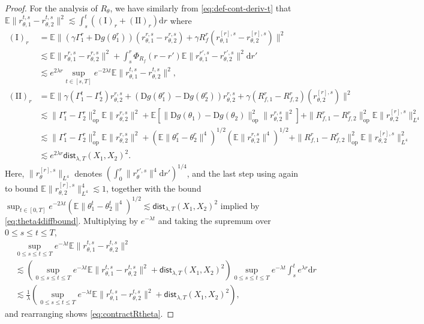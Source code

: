 \documentclass[11pt,letterpaper,reqno]{amsart}
\theoremstyle{definition}
\def\d{\mathrm{d}}
\def\D{\mathrm{D}}
\def\E{\mathbb{E}}
\def\op{\mathrm{op}}
\newcommand{\lbddst}[2]{\mathsf{dist}_{\lambda,T}(#1,#2)}
\newcommand{\normop}[1]{\|#1\|_{\mathrm{op}}}
\begin{document}
\begin{proof}
For the analysis of $R_\theta$, we have similarly
from \eqref{eq:def-cont-deriv-t} that
$\E\|r_{\theta,1}^{t,s}-r_{\theta,2}^{t,s}\|^2
\lesssim \int_s^t ((\mathrm{I})_r+(\mathrm{II})_r)\d r$ where
\begin{align*}
(\mathrm{I})_r&=\E\Big\|(\gamma \Gamma_1^r+\D g(\theta_1^r))
(r_{\theta,1}^{r,s}-r_{\theta,2}^{r,s})
+\gamma R_f^r(r_{\theta,1}^{[r],s}-r_{\theta,2}^{[r],s})\Big\|^2\\
&\lesssim \E\|r_{\theta,1}^{r,s}-r_{\theta,2}^{r,s}\|^2
+\int_s^r \Phi_{R_f}(r-r')\E\|r_{\theta,1}^{r',s}-r_{\theta,2}^{r',s}\|^2\d
r'\\
&\lesssim e^{2\lambda r} \sup_{t \in [s,T]}
e^{-2\lambda t}\E\|r_{\theta,1}^{t,s}-r_{\theta,2}^{t,s}\|^2,\\
(\mathrm{II})_r&=\E\Big\|\gamma(\Gamma^t_1 - \Gamma^t_2)r_{\theta,2}^{r,s}
+(\D g(\theta^r_1)-\D g(\theta^r_2))r_{\theta,2}^{r,s}
+ \gamma (R_{f,1}^r-R_{f,2}^r)(r_{\theta,2}^{[r],s})\Big\|^2\\
&\lesssim \|\Gamma_1^r-\Gamma_2^r\|_\op^2 \E\|r_{\theta,2}^{r,s}\|^2
+\E[\|\D g(\theta_1)-\D g(\theta_2)\|_\op^2\|r_{\theta,2}^{r,s}\|^2]
+\normop{R_{f,1}^r-R_{f,2}^r}^2\E\|r_{\theta,2}^{[r],s}\|_{L^4}^2\\
&\lesssim \|\Gamma_1^r-\Gamma_2^r\|_\op^2 \E\|r_{\theta,2}^{r,s}\|^2
+(\E\|\theta_1^r-\theta_2^r\|^4)^{1/2}(\E\|r_{\theta,2}^{r,s}\|^4)^{1/2}
+\normop{R_{f,1}^r-R_{f,2}^r}^2\E\|r_{\theta,2}^{[r],s}\|_{L^4}^2\\
&\lesssim e^{2\lambda r}\lbddst{X_1}{X_2}^2.
\end{align*}
Here, $\|r_\theta^{[r],s}\|_{L^4}$ denotes
$(\int_0^r \|r_\theta^{r',s}\|^4 \d r')^{1/4}$,
and the last step using again  
to bound $\E\|r_{\theta,2}^{[r],s}\|_{L^4}^4 \lesssim 1$, together with the
bound $\sup_{t \in [0,T]} e^{-2\lambda t}(\E\|\theta_1^t-\theta_2^t\|^4)^{1/2}
\lesssim \lbddst{X_1}{X_2}^2$ implied by \eqref{eq:theta4diffbound}.
Multiplying by $e^{-\lambda t}$ and taking the supremum over $0 \leq s \leq t
\leq T$,
\begin{align*}
&\sup_{0 \leq s \leq t \leq T} e^{-\lambda t}
\E\|r_{\theta,1}^{t,s}-r_{\theta,2}^{t,s}\|^2\\
&\lesssim \left(\sup_{0 \leq s \leq t \leq T} e^{-\lambda t}
\E\|r_{\theta,1}^{t,s}-r_{\theta,2}^{t,s}\|^2
+\lbddst{X_1}{X_2}^2\right)
\sup_{0 \leq s \leq t \leq T} e^{-\lambda t} \int_s^t e^{\lambda r}\d r\\
&\lesssim \frac{1}{\lambda}\left(\sup_{0 \leq s \leq t \leq T} e^{-\lambda t}
\E\|r_{\theta,1}^{t,s}-r_{\theta,2}^{t,s}\|^2
+\lbddst{X_1}{X_2}^2\right),
\end{align*}
and rearranging shows \eqref{eq:contractRtheta}.
\end{proof}
\end{document}
